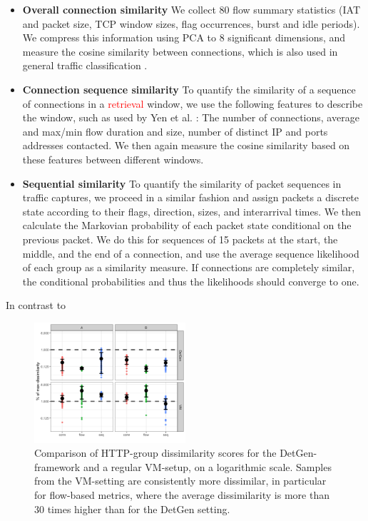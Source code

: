 \documentclass[sigconf]{acmart}
\begin{document}
\begin{itemize}
\item \textbf{Overall connection similarity} We collect 80 flow summary statistics (IAT and packet size, TCP window sizes, flag occurrences, burst and idle periods). We compress this information using PCA to 8 significant dimensions, and measure the cosine similarity between connections, which is also used in general traffic classification \cite{aun2017review}.
\item \textbf{Connection sequence similarity} 
To quantify the similarity of a sequence of connections in a \textcolor{red}{retrieval} window, we use the following features to describe the window, such as used by Yen et al. \cite{yen2009browser}: The number of connections, average and max/min flow duration and size, number of distinct IP and ports addresses contacted. We then again measure the cosine similarity based on these features between different windows. 

\item \textbf{Sequential similarity} To quantify the similarity of packet sequences in traffic captures, we proceed in a similar fashion and assign packets a discrete state according to their flags, direction, sizes, and interarrival times. We then calculate the Markovian probability of each packet state conditional on the previous packet. We do this for sequences of 15 packets at the start, the middle, and the end of a connection, and use the average sequence likelihood of each group as a similarity measure. If connections are completely similar, the conditional probabilities and thus the likelihoods should converge to one.
\end{itemize}

In contrast to 


\begin{figure}
\centering
\includegraphics[width=0.5\textwidth]{images/Exp1.png}
\caption{Comparison of HTTP-group dissimilarity scores for the DetGen-framework and a regular VM-setup, on a logarithmic scale. Samples from the VM-setting are consistently more dissimilar, in particular for flow-based metrics, where the average dissimilarity is more than 30 times higher than for the DetGen setting.}\label{determ-metric}
\end{figure}
\end{document}
